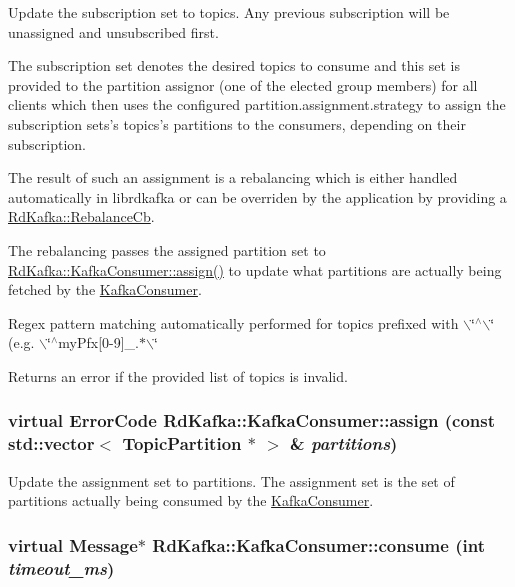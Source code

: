 Update the subscription set to {\ttfamily topics}. Any previous subscription will be unassigned and unsubscribed first.

The subscription set denotes the desired topics to consume and this set is provided to the partition assignor (one of the elected group members) for all clients which then uses the configured {\ttfamily partition.assignment.strategy} to assign the subscription sets's topics's partitions to the consumers, depending on their subscription.

The result of such an assignment is a rebalancing which is either handled automatically in librdkafka or can be overriden by the application by providing a \hyperlink{classRdKafka_1_1RebalanceCb}{RdKafka::RebalanceCb}.

The rebalancing passes the assigned partition set to \hyperlink{classRdKafka_1_1KafkaConsumer_af3f872bcb7d46febbaea63518f854b46}{RdKafka::KafkaConsumer::assign()} to update what partitions are actually being fetched by the \hyperlink{classRdKafka_1_1KafkaConsumer}{KafkaConsumer}.

Regex pattern matching automatically performed for topics prefixed with {\ttfamily $\backslash$\char`\"{}$^\wedge$$\backslash$\char`\"{}} (e.g. {\ttfamily $\backslash$\char`\"{}$^\wedge$myPfx\mbox{[}0-\/9\mbox{]}\_\-.$\ast$$\backslash$\char`\"{}} 

\begin{DoxyReturn}{Returns}
an error if the provided list of topics is invalid. 
\end{DoxyReturn}
\hypertarget{classRdKafka_1_1KafkaConsumer_af3f872bcb7d46febbaea63518f854b46}{
\subsubsection[{assign}]{\setlength{\rightskip}{0pt plus 5cm}virtual ErrorCode RdKafka::KafkaConsumer::assign (const std::vector$<$ {\bf TopicPartition} $\ast$ $>$ \& {\em partitions})}}
\label{classRdKafka_1_1KafkaConsumer_af3f872bcb7d46febbaea63518f854b46}


Update the assignment set to {\ttfamily partitions}. The assignment set is the set of partitions actually being consumed by the \hyperlink{classRdKafka_1_1KafkaConsumer}{KafkaConsumer}. \hypertarget{classRdKafka_1_1KafkaConsumer_a7dc106f1c3b99767a0930a9cf8cabf84}{
\subsubsection[{consume}]{\setlength{\rightskip}{0pt plus 5cm}virtual {\bf Message}$\ast$ RdKafka::KafkaConsumer::consume (int {\em timeout\_\-ms})}}
\label{classRdKafka_1_1KafkaConsumer_a7dc106f1c3b99767a0930a9cf8cabf84}


